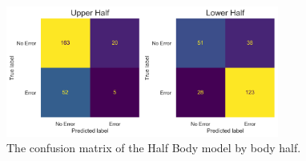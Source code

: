 \begin{figure}[htbp]
  \centering
  \includegraphics[width=0.8\textwidth]{figures/Results/v2/confusion/body_halves_half.png}
  \caption[Half Body Confusion Matrix by Body Half]{The confusion matrix of the Half Body model by body half.}
  \label{fig:conf_v2_hb}
\end{figure}



